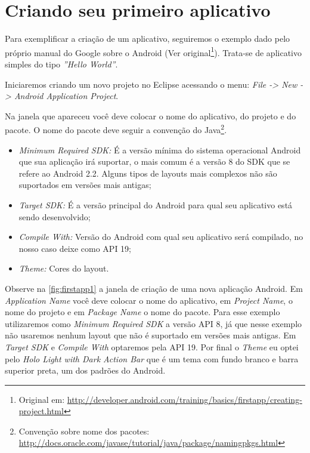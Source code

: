\documentclass[a4paper,12pt,brazil,oneside]{book}
\begin{document}
\section{Criando seu primeiro aplicativo}
Para exemplificar a criação de um aplicativo, seguiremos o exemplo dado pelo próprio manual do Google sobre o Android 
(Ver original\footnote{Original em: \href{http://developer.android.com/training/basics/firstapp/creating-project.html}{http://developer.android.com/training/basics/firstapp/creating-project.html}}). 
Trata-se de aplicativo simples do tipo \emph{''Hello World''}.

Iniciaremos criando um novo projeto no Eclipse acessando o menu: \emph{File -> New -> Android Application Project}.

Na janela que apareceu você deve colocar o nome do aplicativo, do projeto e do pacote. O nome do pacote deve seguir a convenção do Java\footnote{Convenção sobre nome dos pacotes: \href{http://docs.oracle.com/javase/tutorial/java/package/namingpkgs.html}{http://docs.oracle.com/javase/tutorial/java/package/namingpkgs.html}}.
\begin{itemize}
	\item \textit{Minimum Required SDK:} É a versão mínima do sistema operacional Android que sua aplicação irá suportar, o mais comum é a versão 8 do SDK que se refere ao Android 2.2. Alguns tipos de layouts mais complexos não são suportados em versões mais antigas;
	\item \textit{Target SDK:} É a versão principal do Android para qual seu aplicativo está sendo desenvolvido;
	\item \textit{Compile With:} Versão do Android com qual seu aplicativo será compilado, no nosso caso deixe como API 19;
	\item \textit{Theme:} Cores do layout.
\end{itemize}

Observe na \autoref{fig:firstapp1} a janela de criação de uma nova aplicação Android. Em \emph{Application Name} você deve colocar o nome do aplicativo, em \emph{Project Name}, o nome do projeto e em \emph{Package Name} o nome do pacote. Para esse exemplo utilizaremos como \emph{Minimum Required SDK} a versão API 8, já que nesse exemplo não usaremos nenhum layout que não é suportado em versões mais antigas. Em \emph{Target SDK} e \emph{Compile With} optaremos pela API 19. Por final o \emph{Theme} eu optei pelo \emph{Holo Light with Dark Action Bar} que é um tema com fundo branco e barra superior preta, um dos padrões do Android.
\end{document}
